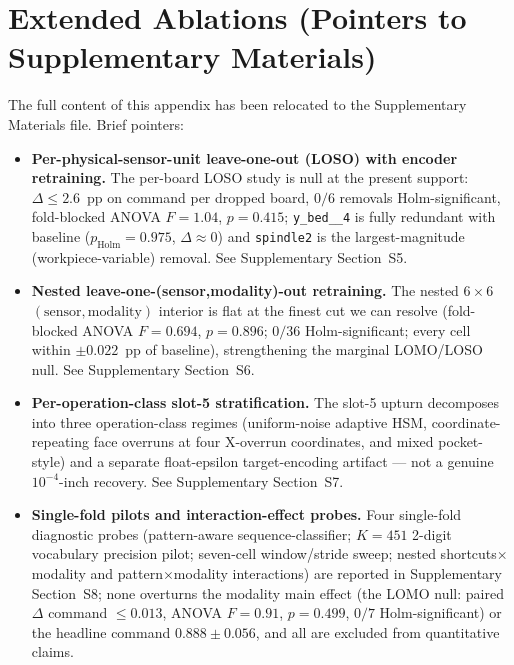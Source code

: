 \documentclass[sensors,article,submit,moreauthors,pdftex]{Definitions/mdpi}
\begin{document}
\clearpage
\section{Extended Ablations (Pointers to Supplementary Materials)}
\label{app:extended-ablations}

The full content of this appendix has been relocated to the Supplementary Materials file. Brief pointers:

\begin{itemize}
\item \textbf{Per-physical-sensor-unit leave-one-out (LOSO) with encoder retraining.} The per-board LOSO study is null at the present support: $\Delta \le 2.6$~pp on command per dropped board, $0/6$ removals Holm-significant, fold-blocked ANOVA $F\!=\!1.04$, $p\!=\!0.415$; \texttt{y\_bed\_\_4} is fully redundant with baseline ($p_{\text{Holm}}\!=\!0.975$, $\Delta\!\approx\!0$) and \texttt{spindle2} is the largest-magnitude (workpiece-variable) removal. See Supplementary Section~S5.
\item \textbf{Nested leave-one-(sensor,modality)-out retraining.} The nested $6\!\times\!6$ $(\text{sensor},\text{modality})$ interior is flat at the finest cut we can resolve (fold-blocked ANOVA $F\!=\!0.694$, $p\!=\!0.896$; $0/36$ Holm-significant; every cell within $\pm 0.022$~pp of baseline), strengthening the marginal LOMO/LOSO null. See Supplementary Section~S6.
\item \textbf{Per-operation-class slot-5 stratification.} The slot-5 upturn decomposes into three operation-class regimes (uniform-noise adaptive HSM, coordinate-repeating face overruns at four X-overrun coordinates, and mixed pocket-style) and a separate float-epsilon target-encoding artifact --- not a genuine $10^{-4}$-inch recovery. See Supplementary Section~S7.
\item \textbf{Single-fold pilots and interaction-effect probes.} Four single-fold diagnostic probes (pattern-aware sequence-classifier; $K\!=\!451$ 2-digit vocabulary precision pilot; seven-cell window/stride sweep; nested shortcuts$\times$modality and pattern$\times$modality interactions) are reported in Supplementary Section~S8; none overturns the modality main effect (the LOMO null: paired $\Delta$ command $\le 0.013$, ANOVA $F\!=\!0.91$, $p\!=\!0.499$, $0/7$ Holm-significant) or the headline command $0.888 \pm 0.056$, and all are excluded from quantitative claims.
\end{itemize}
\end{document}
